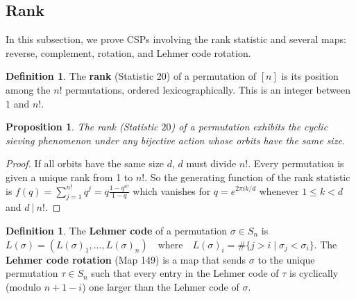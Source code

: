 \documentclass{amsart}
\newtheorem{prop}[thm]{Proposition}
\theoremstyle{definition}
\newtheorem{definition}[thm]{Definition}
\begin{document}
\subsection{Rank}
In this subsection, we prove CSPs involving the rank statistic and several maps: reverse, complement, rotation, and Lehmer code rotation.
\begin{definition}
  The \textbf{rank} (Statistic 20) of a permutation of $[n]$ is its position among the $n!$ permutations, ordered lexicographically. This is an integer between $1$ and $n!$.
\end{definition}

\begin{prop}\label{thm:rank}
  The rank (Statistic $20$) of a permutation exhibits the cyclic sieving phenomenon under any bijective action whose orbits have the same size.
\end{prop}
\begin{proof} If all orbits have the same size $d$, $d$ must divide $n!$.
  Every permutation is given a unique rank from 1 to $n!$. So the generating function of the rank statistic is
$
    f(q)= \displaystyle\sum_{j=1}^{n!}q^j
=q\frac{1-q^{n!}}{1-q}$ which vanishes for $q = e^{2\pi ik/d}$ whenever $1\leq k < d$ and $d \ | \ n!$.
\end{proof}


\begin{definition}
  \label{def:lehmercode}
  The \textbf{Lehmer code} of a permutation $\sigma\in S_n$ is
  $L(\sigma )=(L(\sigma )_{1},\ldots, L(\sigma )_{n})\quad {\text{where}}\quad L(\sigma )_{i}=\#\{j>i\mid \sigma _{j}<\sigma _{i}\}$.
  The \textbf{Lehmer code rotation} (Map 149) is a map that sends $\sigma$ to the unique permutation $\tau\in S_n$ such that every entry in the Lehmer code of $\tau$ is cyclically (modulo $n+1-i$) one larger than the Lehmer code of $\sigma$.
\end{definition} 
\end{document}
